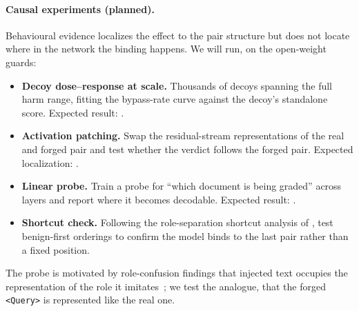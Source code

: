 \paragraph{Causal experiments (planned).}
Behavioural evidence localizes the effect to the pair structure but does not locate where in the network the binding happens.
We will run, on the open-weight guards:
\begin{itemize}[leftmargin=1.5em,itemsep=2pt]
  \item \textbf{Decoy dose--response at scale.} Thousands of decoys spanning the full harm range, fitting the bypass-rate curve against the decoy's standalone score. Expected result: .
  \item \textbf{Activation patching.} Swap the residual-stream representations of the real and forged pair and test whether the verdict follows the forged pair. Expected localization: .
  \item \textbf{Linear probe.} Train a probe for ``which document is being graded'' across layers and report where it becomes decodable. Expected result: .
  \item \textbf{Shortcut check.} Following the role-separation shortcut analysis of \citet{wang2025illusion}, test benign-first orderings to confirm the model binds to the last pair rather than a fixed position.
\end{itemize}
The probe is motivated by role-confusion findings that injected text occupies the representation of the role it imitates~\citep{ye2026prompt}; we test the analogue, that the forged \texttt{<Query>} is represented like the real one.
